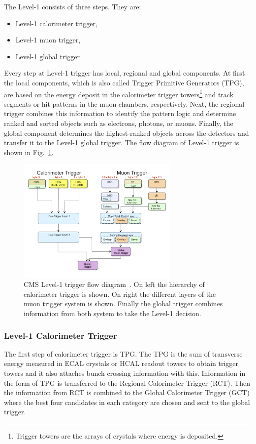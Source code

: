 The Level-1 consists of three steps. They are:
\begin{itemize}
	\item Level-1 calorimeter trigger,
	\item Level-1 muon trigger,
	\item Level-1 global trigger
\end{itemize}
Every step at Level-1 trigger has local, regional and global components. At first the local components, which is also called Trigger Primitive Generators (TPG), are based on the energy deposit in the calorimeter trigger towers\footnote{Trigger towers are the arrays of crystals where energy is deposited.} and track segments or hit patterns in the muon chambers, respectively. 
Next, the regional trigger combines this information to identify the pattern logic and determine ranked and sorted objects such as electrons, photons, or muons. Finally, the global component determines the highest-ranked objects across the detectors and transfer it to the Level-1 global trigger. The flow diagram of Level-1 trigger is shown in Fig.~\ref{fig:cms-L1-trigger}.
\begin{figure}[htbp]
	\centering
	\includegraphics[width=0.70\textwidth]{figures/LHC/TriggerBlockDiagram_Eta.jpg}
	\caption{CMS Level-1 trigger flow diagram~\cite{L1trigger-2013}. On left the hierarchy of calorimeter trigger is shown. On right the different layers of the muon trigger system is shown. Finally the global trigger combines information from both system to take the Level-1 decision.}
	\label{fig:cms-L1-trigger}
\end{figure}

\subsubsection{Level-1 Calorimeter Trigger} %
\label{ssub:l1_calorimeter_trigger}
The first step of calorimeter trigger is TPG. The TPG is the sum of transverse energy measured in ECAL crystals or HCAL readout towers to obtain trigger towers and it also attaches bunch crossing information with this. Information in the form of TPG is transferred to the Regional Calorimeter Trigger (RCT). Then the information from RCT is combined to the Global Calorimeter Trigger (GCT) where the best four candidates in each category are chosen and sent to the global trigger.

